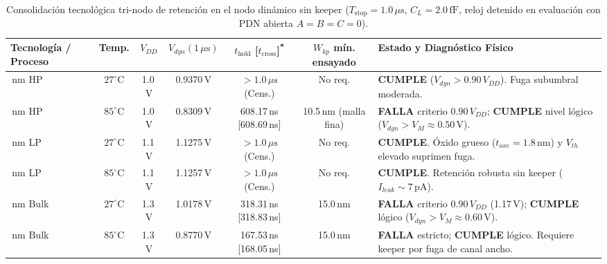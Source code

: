 \begin{table}[htbp]
\centering
\scriptsize
\setlength{\tabcolsep}{3pt}
\caption[Consolidación tecnológica tri-nodo de retención sin keeper]{Consolidación tecnológica tri-nodo de retención en el nodo dinámico sin keeper ($T_{\text{stop}}=1.0\,\mu\text{s}$, $C_L=2.0\,\text{fF}$, reloj detenido en evaluación con PDN abierta $A=B=C=0$).}
\label{tab:retencion_tecnologica}
\begin{tabularx}{\linewidth}{@{}>{\RaggedRight\arraybackslash}p{2.3cm} c c c c c >{\RaggedRight\arraybackslash}X@{}}
\toprule
\textbf{Tecnología / Proceso} & \textbf{Temp.} & \textbf{$V_{DD}$} & \textbf{$V_{dyn}(1\,\mu\text{s})$} & \textbf{$t_{\text{hold}}$ [$t_{\text{cross}}$]\textsuperscript{*}} & \textbf{$W_{kp}$ mín. ensayado} & \textbf{Estado y Diagnóstico Físico} \\
\midrule
45\,nm HP & $27^\circ\text{C}$ & 1.0\,V & 0.9370\,V & $>1.0\,\mu\text{s}$ (Cens.) & No req. & \textbf{CUMPLE} ($V_{dyn} > 0.90\,V_{DD}$). Fuga subumbral moderada. \\
45\,nm HP & $85^\circ\text{C}$ & 1.0\,V & 0.8309\,V & 608.17\,ns [608.69\,ns] & 10.5\,nm (malla fina) & \textbf{FALLA} criterio $0.90\,V_{DD}$; \textbf{CUMPLE} nivel lógico ($V_{dyn} > V_M \approx 0.50\,\text{V}$). \\
\midrule
45\,nm LP & $27^\circ\text{C}$ & 1.1\,V & 1.1275\,V & $>1.0\,\mu\text{s}$ (Cens.) & No req. & \textbf{CUMPLE}. Óxido grueso ($t_{oxe}=1.8\,\text{nm}$) y $V_{th}$ elevado suprimen fuga. \\
45\,nm LP & $85^\circ\text{C}$ & 1.1\,V & 1.1257\,V & $>1.0\,\mu\text{s}$ (Cens.) & No req. & \textbf{CUMPLE}. Retención robusta sin keeper ($I_{leak} \sim 7\,\text{pA}$). \\
\midrule
130\,nm Bulk & $27^\circ\text{C}$ & 1.3\,V & 1.0178\,V & 318.31\,ns [318.83\,ns] & 15.0\,nm & \textbf{FALLA} criterio $0.90\,V_{DD}$ (1.17\,V); \textbf{CUMPLE} lógico ($V_{dyn} > V_M \approx 0.60\,\text{V}$). \\
130\,nm Bulk & $85^\circ\text{C}$ & 1.3\,V & 0.8770\,V & 167.53\,ns [168.05\,ns] & 15.0\,nm & \textbf{FALLA} estricto; \textbf{CUMPLE} lógico. Requiere keeper por fuga de canal ancho. \\
\midrule

\end{tabularx}
\end{table}
